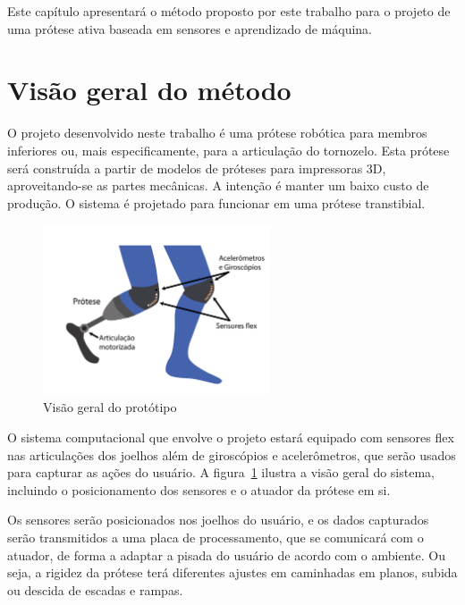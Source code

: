 Este capítulo apresentará o método proposto por este trabalho para o projeto de uma prótese ativa baseada em sensores e aprendizado de máquina.

\section{Visão geral do método}
\label{sec:metodo_protese}

O projeto desenvolvido neste trabalho é uma prótese robótica para membros inferiores ou, mais especificamente, para a articulação do tornozelo. Esta prótese será construída a partir de modelos de próteses para impressoras 3D, aproveitando-se as partes mecânicas. A intenção é manter um baixo custo de produção. O sistema é projetado para funcionar em uma prótese transtibial.

\begin{figure}[h]
	\caption{\label{fig:big_picture}Visão geral do protótipo}
	\begin{center}
	    \includegraphics[width=0.6\textwidth]{resources/big_picture}
	\end{center}
\end{figure}

O sistema computacional que envolve o projeto estará equipado com sensores flex nas articulações dos joelhos além de giroscópios e acelerômetros, que serão usados para capturar as ações do usuário. A figura~\ref{fig:big_picture} ilustra a visão geral do sistema, incluindo o posicionamento dos sensores e o atuador da prótese em si.

Os sensores serão posicionados nos joelhos do usuário, e os dados capturados serão transmitidos a uma placa de processamento, que se comunicará com o atuador, de forma a adaptar a pisada do usuário de acordo com o ambiente. Ou seja, a rigidez da prótese terá diferentes ajustes em caminhadas em planos, subida ou descida de escadas e rampas.

